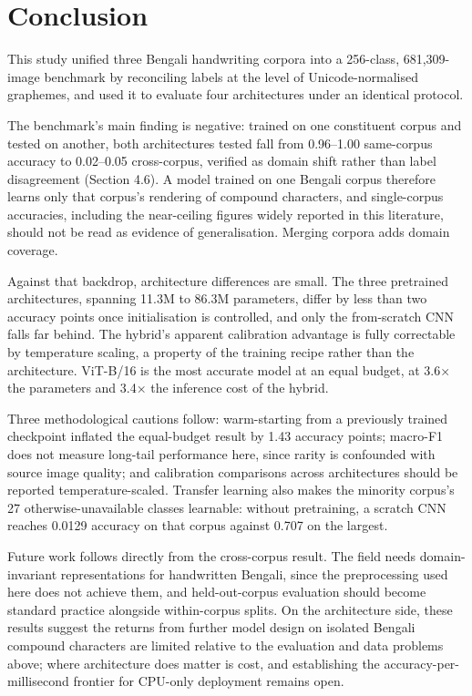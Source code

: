 \hypertarget{conclusion}{%
\section{Conclusion}\label{conclusion}}

This study unified three Bengali handwriting corpora into a 256-class,
681,309-image benchmark by reconciling labels at the level of
Unicode-normalised graphemes, and used it to evaluate four architectures
under an identical protocol.

The benchmark's main finding is negative: trained on one constituent corpus and
tested on another, both architectures tested fall from 0.96--1.00 same-corpus
accuracy to 0.02--0.05 cross-corpus, verified as domain shift rather
than label disagreement (Section 4.6). A model trained on one Bengali
corpus therefore learns only that corpus's rendering of compound
characters, and single-corpus accuracies, including the near-ceiling figures widely
reported in this literature, should not be read as evidence of
generalisation. Merging corpora adds domain coverage.

Against that backdrop, architecture differences are small. The three pretrained architectures, spanning 11.3M to 86.3M parameters, differ by less than two accuracy points once initialisation is controlled, and only the from-scratch CNN falls far behind. The hybrid's
apparent calibration advantage is fully correctable by temperature
scaling, a property of the training recipe rather than the
architecture. ViT-B/16 is the most accurate model at an equal budget, at
3.6× the parameters and 3.4× the inference cost of the hybrid.

Three methodological cautions follow: warm-starting from a previously trained checkpoint inflated the equal-budget result by 1.43 accuracy points; macro-F1 does not measure long-tail performance here, since rarity is confounded with source image quality; and calibration comparisons across architectures should be reported temperature-scaled. Transfer learning also makes the minority corpus's 27 otherwise-unavailable classes learnable: without pretraining, a scratch CNN reaches 0.0129 accuracy on that corpus against 0.707 on the largest.

Future work follows directly from the cross-corpus result. The field
needs domain-invariant representations for handwritten Bengali, since
the preprocessing used here does not achieve them, and
held-out-corpus evaluation should become standard practice alongside
within-corpus splits. On the architecture side, these results suggest
the returns from further model design on isolated Bengali compound
characters are limited relative to the evaluation and data problems
above; where architecture does matter is cost, and establishing the
accuracy-per-millisecond frontier for CPU-only deployment remains open.


